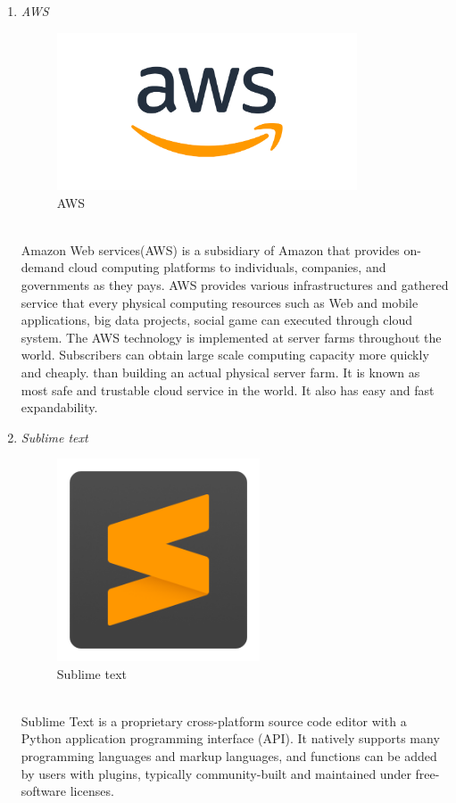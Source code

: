 \documentclass[conference]{IEEEtran}
\begin{document}
\begin{enumerate}
   \item \textit{AWS }
          \begin{figure}[htbp]
	\centerline{\includegraphics[width=89mm, scale=0.5]{fig/aws.png}}
	\caption{AWS}
	\label{fig}
	\end{figure}
   \\Amazon Web services(AWS) is a subsidiary of Amazon that provides on-demand cloud computing platforms to individuals, companies, and governments as they pays. AWS provides various infrastructures and gathered service that every physical computing resources such as Web and mobile applications, big data projects, social game can executed through cloud system. The AWS technology is implemented at server farms throughout the world. Subscribers can obtain large scale computing capacity more quickly and cheaply. than building an actual physical server farm. It is known as most safe and trustable cloud service in the world. It also has easy and fast expandability. \\
   \item \textit{Sublime text } 
             \begin{figure}[htbp]
	\centerline{\includegraphics[width=60mm, scale=0.5]{fig/sublime.png}}
	\caption{Sublime text}
	\label{fig}
	\end{figure}
   \\Sublime Text is a proprietary cross-platform source code editor with a Python application programming interface (API). It natively supports many programming languages and markup languages, and functions can be added by users with plugins, typically community-built and maintained under free-software licenses.\\

\end{enumerate}
\end{document}
